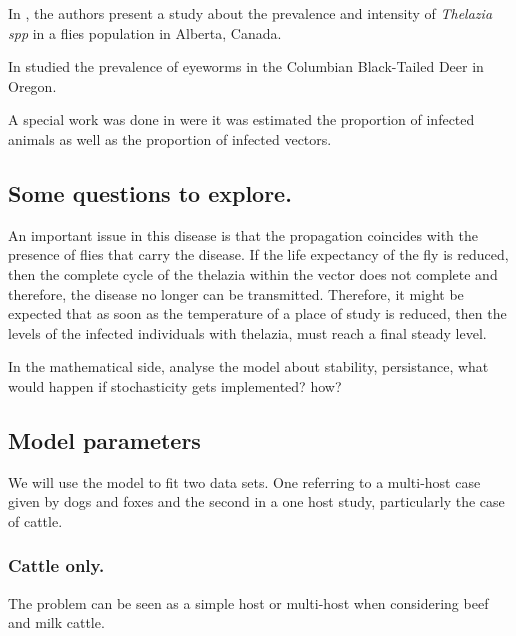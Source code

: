 \documentclass[preprint,12pt]{elsarticle}
\begin{document}
        In \cite{Ohara:1989}, the authors present a study about the 
    prevalence and intensity of \textit{Thelazia spp} in a flies population in 
    Alberta, Canada.


        In \cite{Beitel:1974} studied the prevalence of eyeworms in the 
    Columbian Black-Tailed Deer in Oregon. 

        A special work was done in \cite{Moolenbeek:1980} were it was estimated 
    the proportion of infected animals as well as the proportion of infected 
    vectors.

\subsection{Some questions to explore.}
        An important issue in this disease is that the propagation coincides 
    with the presence of flies that carry the disease. If the life expectancy 
    of the fly is reduced, then the complete cycle of the thelazia within the 
    vector does not complete and therefore, the disease no longer can be 
    transmitted. Therefore, it might be expected that as 
    soon as the temperature of a place of study is reduced, then the levels of 
    the infected individuals with thelazia, must reach a final steady level.

        In the mathematical side, analyse the model about stability, 
    persistance, what would happen if stochasticity gets implemented? how?

\subsection{Model parameters}


        We will use the model to fit two data sets. One referring to a 
    multi-host case given by dogs and foxes and the second in a one host study, 
    particularly the case of cattle.

\subsubsection{Cattle only.}
    The problem can be seen as a simple host or multi-host when considering 
beef and milk cattle.
\end{document}
